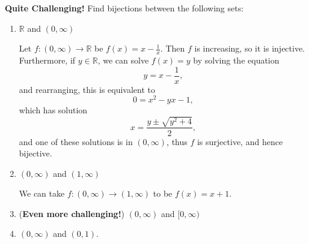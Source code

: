 \documentclass[11pt,dvipsnames]{book}
\def\R{\mathbb{R}}
\def\C{{\mathbb{C}}}
\numberwithin{figure}{section} %
\numberwithin{table}{section} %
\begin{document}
%
%
%


\begin{exercise} {\bf Quite Challenging!} Find bijections between the following sets:

\begin{enumerate}[label=(\alph*)]
\item $\R$ and $(0,\infty)$

\begin{solution}
Let $f:(0,\infty) \rightarrow \R $ be $f(x)=x-\frac{1}{x}$. Then $f$ is increasing, so it is injective. Furthermore, if $y\in \R$, we can solve $f(x)=y$ by solving the equation
\[
y= x-\frac{1}{x},
\]
and rearranging, this is equivalent to
\[
0=x^2-yx-1,\]
which has solution
\[
x=\frac{y\pm\sqrt{y^2+4}}{2},\]
and one of these solutions is in $(0,\infty)$, thus $f$ is surjective, and hence bijective.
\end{solution}

\item $(0,\infty)$ and $(1,\infty)$

\begin{solution}
We can take $f:(0,\infty)\rightarrow (1,\infty)$ to be $f(x)=x+1$.
\end{solution}

\item ({\bf Even more challenging!}) $(0,\infty)$ and $[0,\infty)$

\item $(0,\infty)$ and $(0,1)$.
\end{enumerate}

\end{exercise}
\end{document}
